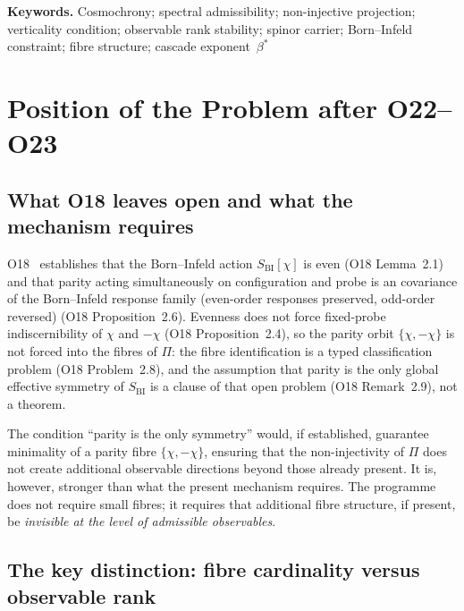 \documentclass[11pt,a4paper]{article}
\newcommand{\bstar}{\beta^*}
\newcommand{\SBI}{S_{\mathrm{BI}}}
\begin{document}
  \medskip
  \noindent\textbf{Keywords.}
  Cosmochrony; spectral admissibility; non-injective projection; verticality condition;
  observable rank stability; spinor carrier; Born--Infeld constraint;
  fibre structure; cascade exponent~$\bstar$

  \clearpage
  \tableofcontents

  \clearpage
  \section{Position of the Problem after O22--O23}
    \label{sec:position}

    \subsection{What O18 leaves open and what the mechanism requires}
      \label{sec:o18}

      O18~\cite{Beau2026a22} establishes that the Born--Infeld action $\SBI[\chi]$ is even
      (O18 Lemma~2.1) and that parity acting simultaneously on configuration and probe is an
      covariance of the Born--Infeld response family (even-order responses preserved, odd-order reversed) (O18 Proposition~2.6).
      Evenness does not force fixed-probe indiscernibility of $\chi$ and $-\chi$
      (O18 Proposition~2.4), so the parity orbit $\{\chi, -\chi\}$ is not forced into the
      fibres of $\Pi$: the fibre identification is a typed classification problem
      (O18 Problem~2.8), and the assumption that parity is the only global effective symmetry
      of $\SBI$ is a clause of that open problem (O18 Remark~2.9), not a theorem.

      The condition ``parity is the only symmetry'' would, if established, guarantee minimality
      of a parity fibre $\{\chi, -\chi\}$, ensuring that the non-injectivity of $\Pi$ does not
      create additional observable directions beyond those already present.
      It is, however, stronger than what the present mechanism requires.
      The programme does not require small fibres; it requires that additional fibre structure, if
      present, be \emph{invisible at the level of admissible observables}.

    \subsection{The key distinction: fibre cardinality versus observable rank}
      \label{sec:distinction}
\end{document}
